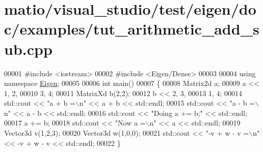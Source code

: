 \hypertarget{matio_2visual__studio_2test_2eigen_2doc_2examples_2tut__arithmetic__add__sub_8cpp_source}{}\section{matio/visual\+\_\+studio/test/eigen/doc/examples/tut\+\_\+arithmetic\+\_\+add\+\_\+sub.cpp}
\label{matio_2visual__studio_2test_2eigen_2doc_2examples_2tut__arithmetic__add__sub_8cpp_source}

\begin{DoxyCode}
00001 \textcolor{preprocessor}{#include <iostream>}
00002 \textcolor{preprocessor}{#include <Eigen/Dense>}
00003 
00004 \textcolor{keyword}{using namespace }\hyperlink{namespace_eigen}{Eigen};
00005 
00006 \textcolor{keywordtype}{int} main()
00007 \{
00008   Matrix2d a;
00009   a << 1, 2,
00010        3, 4;
00011   MatrixXd b(2,2);
00012   b << 2, 3,
00013        1, 4;
00014   std::cout << \textcolor{stringliteral}{"a + b =\(\backslash\)n"} << a + b << std::endl;
00015   std::cout << \textcolor{stringliteral}{"a - b =\(\backslash\)n"} << a - b << std::endl;
00016   std::cout << \textcolor{stringliteral}{"Doing a += b;"} << std::endl;
00017   a += b;
00018   std::cout << \textcolor{stringliteral}{"Now a =\(\backslash\)n"} << a << std::endl;
00019   Vector3d v(1,2,3);
00020   Vector3d w(1,0,0);
00021   std::cout << \textcolor{stringliteral}{"-v + w - v =\(\backslash\)n"} << -v + w - v << std::endl;
00022 \}
\end{DoxyCode}
